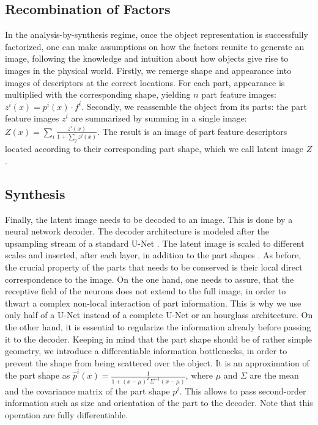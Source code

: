 	\subsection{Recombination of Factors}
		In the analysis-by-synthesis regime, once the object representation is successfully factorized, one can make assumptions on how the factors reunite to generate an image, following the knowledge and intuition about how objects give rise to images in the physical world.
		Firstly, we remerge shape and appearance into images of descriptors at the correct locations. For each part, appearance is multiplied with the corresponding shape, yielding $n$ part feature images: $z^i(x) = p^i(x) \cdot f^i$.
		Secondly, we reassemble the object from its parts: the part feature images $z^i$ are summarized by summing in a single image: $ Z(x) = \sum_i \frac{z^i(x)}{1 + \sum_j z^j(x)}$. The result is an image of part feature descriptors located according to their corresponding part shape, which we call latent image $Z$.\\


	\subsection{Synthesis}
		Finally, the latent image needs to be decoded to an image. This is done by a neural network decoder. The decoder architecture is modeled after the upsampling stream of a standard U-Net \cite{}. The latent image is scaled to different scales  and inserted, after each layer, in addition to the part shapes . As before, the crucial property of the parts that needs to be conserved is their local direct correspondence to the image. On the one hand, one needs to assure, that the receptive field of the neurons does not extend to the full image, in order to thwart a complex non-local interaction of part information. This is why we use only half of a U-Net instead of a complete U-Net or an hourglass architecture.
		On the other hand, it is essential to regularize the information already before passing it to the decoder. Keeping in mind that the part shape should be of rather simple geometry, we introduce a differentiable information bottlenecks, in order to prevent the shape from being scattered over the object. It is an approximation of the part shape as $\hat p^i(x) = \frac{1}{1 + (x -\mu)^T \Sigma^{-1} (x - \mu)}$, where $\mu$ and $\Sigma$ are the mean and the covariance matrix of the part shape $p^i$. This allows to pass second-order information such as size and orientation of the part to the decoder. Note that this operation are fully differentiable.



